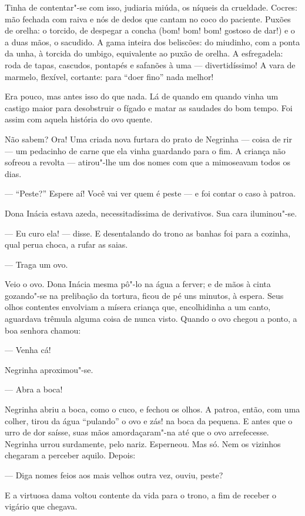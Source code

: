 Tinha de contentar"-se com isso, judiaria miúda, os níqueis da crueldade.
Cocres: mão fechada com raiva e nós de dedos que cantam no coco do
paciente. Puxões de orelha: o torcido, de despegar a concha (bom! bom!
bom! gostoso de dar!) e o a duas mãos, o sacudido. A gama inteira dos
beliscões: do miudinho, com a ponta da unha, à torcida do umbigo,
equivalente ao puxão de orelha. A esfregadela: roda de tapas, cascudos,
pontapés e safanões à uma --- divertidíssimo! A vara de marmelo,
flexível, cortante: para ``doer fino'' nada melhor!

Era pouco, mas antes isso do que nada. Lá de quando em quando vinha um
castigo maior para desobstruir o fígado e matar as saudades do bom
tempo. Foi assim com aquela história do ovo quente.

Não sabem? Ora! Uma criada nova furtara do prato de Negrinha --- coisa
de rir --- um pedacinho de carne que ela vinha guardando para o fim. A
criança não sofreou a revolta --- atirou"-lhe um dos nomes com que a
mimoseavam todos os dias.

--- ``Peste?'' Espere aí! Você vai ver quem é peste --- e foi contar o
caso à patroa.

Dona Inácia estava azeda, necessitadíssima de derivativos. Sua cara
iluminou"-se.

--- Eu curo ela! --- disse. E desentalando do trono as banhas foi para a
cozinha, qual perua choca, a rufar as saias.

--- Traga um ovo.

Veio o ovo. Dona Inácia mesma pô"-lo na água a ferver; e de mãos à cinta
gozando"-se na prelibação da tortura, ficou de pé uns minutos, à espera.
Seus olhos contentes envolviam a mísera criança que, encolhidinha a um
canto, aguardava trêmula alguma coisa de nunca visto. Quando o ovo
chegou a ponto, a boa senhora chamou:

--- Venha cá!

Negrinha aproximou"-se.

--- Abra a boca!

Negrinha abriu a boca, como o cuco, e fechou os olhos. A patroa, então,
com uma colher, tirou da água ``pulando'' o ovo e zás! na boca da
pequena. E antes que o urro de dor saísse, suas mãos amordaçaram"-na até
que o ovo arrefecesse. Negrinha urrou surdamente, pelo nariz. Esperneou.
Mas só. Nem os vizinhos chegaram a perceber aquilo. Depois:

--- Diga nomes feios aos mais velhos outra vez, ouviu, peste?

E a virtuosa dama voltou contente da vida para o trono, a fim de receber
o vigário que chegava.

